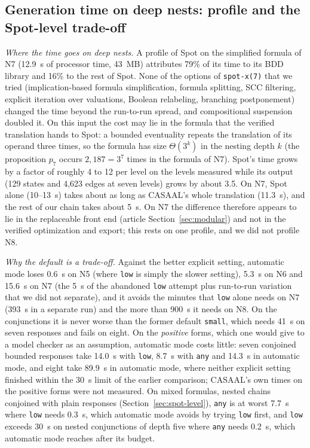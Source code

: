\subsection{Generation time on deep nests: profile and the Spot-level trade-off}
\label{sec:deep-nests}
\emph{Where the time goes on deep nests.} A profile of Spot on the simplified
formula of N7 (12.9~s of processor time, 43~MB) attributes 79\% of its time to
its BDD library and 16\% to the rest of Spot. None of the options of
\texttt{spot-x(7)} that we tried (implication-based formula simplification,
formula splitting, SCC filtering, explicit iteration over valuations, Boolean
relabeling, branching postponement) changed the time beyond the run-to-run
spread, and compositional suspension doubled it. On this input the cost may lie in the formula
that the verified translation hands to Spot: a bounded eventuality repeats
the translation of its operand three times, so the formula has size $\Theta(3^k)$ in the
nesting depth $k$ (the proposition $p_7$ occurs $2{,}187=3^7$ times in the
formula of N7). Spot's time grows by a factor of roughly 4 to 12 per level on the levels measured while its
output (129 states and 4{,}623 edges at seven levels) grows by about 3.5. On N7,
Spot alone (10--13~s) takes about as long as CASAAL's whole translation
(11.3~s), and the rest of our chain takes about 5~s. On N7 the difference therefore appears to lie in
the replaceable front end (article Section~\ref{sec:modular}) and not in the verified
optimization and export; this rests on one profile, and we did not profile N8.

\emph{Why the default is a trade-off.} Against the better explicit setting,
automatic mode loses 0.6~s on N5 (where \texttt{low} is simply the slower
setting), 5.3~s on N6 and 15.6~s on N7 (the 5~s of the abandoned \texttt{low}
attempt plus run-to-run variation that we did not separate), and it avoids the
minutes that \texttt{low} alone needs on N7 (393~s in a separate run) and the
more than 900~s it needs on N8. On the conjunctions it is never
worse than the former default \texttt{small}, which needs 41~s on seven
responses and fails on eight. On the \emph{positive} forms, which one would give
to a model checker as an assumption, automatic mode costs little: seven
conjoined bounded responses take 14.0~s with \texttt{low}, 8.7~s with
\texttt{any} and 14.3~s in automatic mode, and eight take 89.9~s in automatic
mode, where neither explicit setting finished within the 30~s limit of the
earlier comparison; CASAAL's own times on the positive forms were not measured.
On mixed formulas, nested chains conjoined with plain responses
(Section~\ref{sec:spot-level}), \texttt{any} is at worst 7.7~s where \texttt{low}
needs 0.3~s, which automatic mode avoids by trying \texttt{low} first, and
\texttt{low} exceeds 30~s on nested conjunctions of depth five where \texttt{any}
needs 0.2~s, which automatic mode reaches after its budget.


